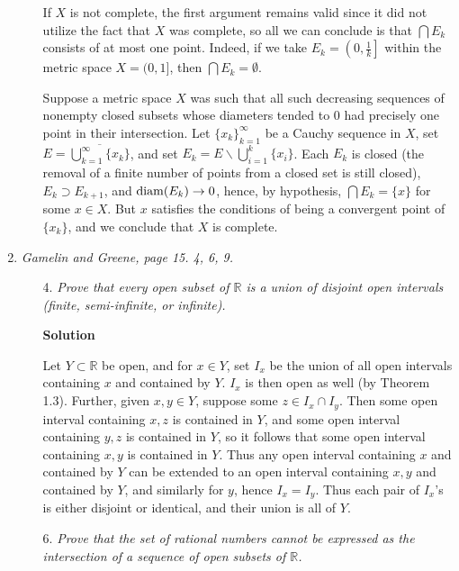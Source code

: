 \documentclass{article}
\def\diam{\mathop{\rm diam}\nolimits}
\begin{document}
\begin{enumerate}
\begin{itemize}
If \(X\) is not complete, the first argument remains valid since it did not utilize the fact that \(X\) was complete, so all we can conclude is that \(\bigcap E_k\) consists of at most one point.  Indeed, if we take \(E_k = \left( 0, \frac{1}{k} \right]\) within the metric space \(X = (0,1]\), then \(\bigcap E_k = \emptyset\).

Suppose a metric space \(X\) was such that all such decreasing sequences of nonempty closed subsets whose diameters tended to \(0\) had precisely one point in their intersection.  Let \(\{x_k\}_{k = 1}^{\infty}\) be a Cauchy sequence in \(X\), set \(E = \overline{\bigcup_{k = 1}^{\infty} \{x_k\}}\), and set \(E_k = E \backslash \bigcup_{i = 1}^k \{x_i\}\).  Each \(E_k\) is closed (the removal of a finite number of points from a closed set is still closed), \(E_k \supset E_{k + 1}\), and \(\diam(E_k) \to 0\), hence, by hypothesis, \(\bigcap E_k = \{x\}\) for some \(x \in X\).  But \(x\) satisfies the conditions of being a convergent point of \(\{x_k\}\), and we conclude that \(X\) is complete.



\end{itemize}

\item {\em Gamelin and Greene, page 15.  4, 6, 9.}

\begin{itemize}

\item[4.] {\em Prove that every open subset of \(\mathbb{R}\) is a union of disjoint open intervals (finite, semi-infinite, or infinite).}

{\bf Solution}

Let \(Y \subset \mathbb{R}\) be open, and for \(x \in Y\), set \(I_x\) be the union of all open intervals containing \(x\) and contained by \(Y\).  \(I_x\) is then open as well (by Theorem 1.3).  Further, given \(x,y \in Y\), suppose some \(z \in I_x \cap I_y\).  Then some open interval containing \(x,z\) is contained in \(Y\), and some open interval containing \(y,z\) is contained in \(Y\), so it follows that some open interval containing \(x,y\) is contained in \(Y\).  Thus any open interval containing \(x\) and contained by \(Y\) can be extended to an open interval containing \(x,y\) and contained by \(Y\), and similarly for \(y\), hence \(I_x = I_y\).  Thus each pair of \(I_x\)'s is either disjoint or identical, and their union is all of \(Y\).


\item[6.] {\em Prove that the set of rational numbers cannot be expressed as the intersection of a sequence of open subsets of \(\mathbb{R}\).}


\end{itemize}
\end{enumerate}
\end{document}
